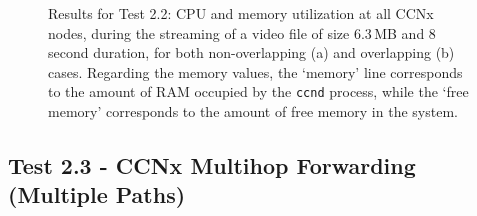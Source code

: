 \begin{figure}[H]
    \centering



    \cprotect\caption{Results for Test 2.2: CPU and memory utilization at 
        all CCNx nodes, during the streaming of a video file of size 
        6.3\,MB and 8 second duration, for both non-overlapping (a) and 
        overlapping (b) cases. Regarding the 
        memory values, the `memory' line corresponds to the amount of RAM 
        occupied by the \verb+ccnd+ process, while the `free memory' corresponds 
        to the amount of free memory in the system.}
    \label{fig:video-cpu}

\end{figure}

\subsection{Test 2.3 - CCNx Multihop Forwarding (Multiple Paths)}
\label{subapp:test-multihop-multipath}

